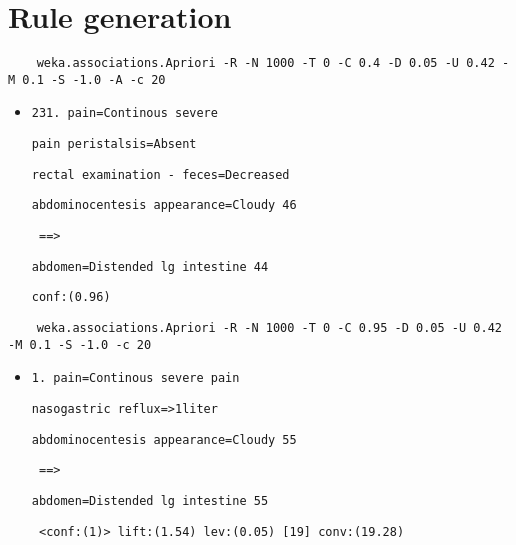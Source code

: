 \section{Rule generation}
\begin{verbatim}
	weka.associations.Apriori -R -N 1000 -T 0 -C 0.4 -D 0.05 -U 0.42 -M 0.1 -S -1.0 -A -c 20
\end{verbatim}
\begin{itemize}
\item \verb|231. pain=Continous severe|

\verb|pain peristalsis=Absent |

\verb|rectal examination - feces=Decreased |

\verb|abdominocentesis appearance=Cloudy 46|
 
\verb| ==> |

\verb|abdomen=Distended lg intestine 44   |

\verb|conf:(0.96)|
\end{itemize}
\begin{verbatim}
	weka.associations.Apriori -R -N 1000 -T 0 -C 0.95 -D 0.05 -U 0.42 -M 0.1 -S -1.0 -c 20
\end{verbatim}
\begin{itemize}
\item \verb|1. pain=Continous severe pain|

\verb|nasogastric reflux=>1liter |

\verb|abdominocentesis appearance=Cloudy 55|

 \verb| ==> |
 
 \verb|abdomen=Distended lg intestine 55 |

 \verb| <conf:(1)> lift:(1.54) lev:(0.05) [19] conv:(19.28)|
\end{itemize}